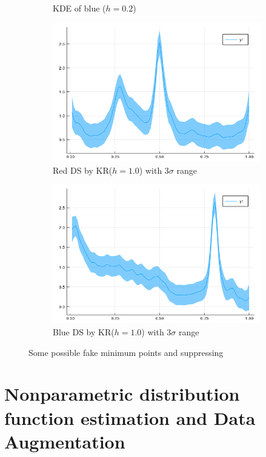\documentclass{article}
\begin{document}
\begin{figure}[htb]
\begin{subfigure}[b]{0.4\linewidth}
    \caption{KDE of blue ($h=0.2$)}
  \end{subfigure}
  \begin{subfigure}[b]{0.4\linewidth}
    \includegraphics[width=\linewidth]{images/kde_reg_r.png}
    \caption{Red DS by KR($h=1.0$) with 3$\sigma$ range}
  \end{subfigure}
  \begin{subfigure}[b]{0.4\linewidth}
    \includegraphics[width=\linewidth]{images/kde_reg_b.png}
    \caption{Blue DS by KR($h=1.0$) with 3$\sigma$ range}
  \end{subfigure}
  \caption{Some possible fake minimum points and suppressing}
  \label{fig:DS_REG}
\end{figure}

\section{Nonparametric distribution function estimation and Data Augmentation}
\end{document}
